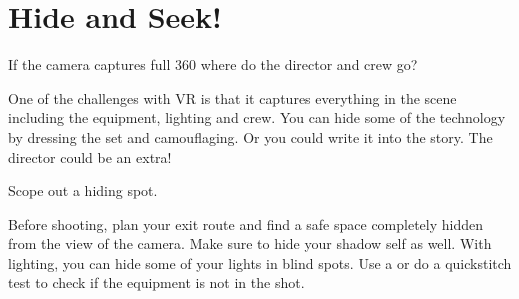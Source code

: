 \section{Hide and Seek!}
\pagecolor{white}
\label{chap:14}
\begin{fullwidth}

\problem

{\large If the camera captures full 360 where do the director and crew go? \par}

One of the challenges with VR is that it captures everything in the scene including the equipment, lighting and crew. You can hide some of the technology by dressing the set and camouflaging. Or you could write it into the story. The director could be an extra!



\solution

{\large Scope out a hiding spot. \par}

Before shooting, plan your exit route and find a safe space completely hidden from the view of the camera. Make sure to hide your shadow self as well. 
With lighting, you can hide some of your lights in blind spots. Use a \textbf{} or do a quickstitch test to check if the equipment is not in the shot. 





\clearpage
\end{fullwidth}
